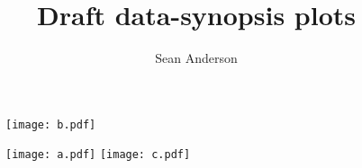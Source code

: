 \documentclass[12pt]{article}
\title{Draft data-synopsis plots}
\author{Sean Anderson}
\begin{document}


\restoregeometry
\textheight 26cm








\begin{figure}[htp]
  \centering
  \parbox{\textwidth}{
    \parbox{2in}{%
     \texttt{[image: b.pdf]}
    }
    \parbox{2in}{%
      \texttt{[image: a.pdf]}
     \texttt{[image: c.pdf]}
    }
  }
\end{figure}


\end{document}
